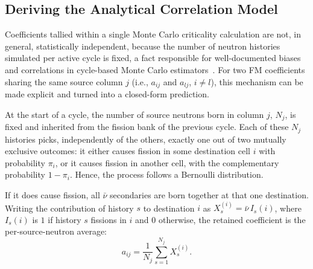 \documentclass{style/nseJournal}
\begin{document}

\subsection{Deriving the Analytical Correlation Model}
\label{sec:analytical_derivation}

Coefficients tallied within a single Monte Carlo criticality calculation are not, in general, statistically independent, because the number of neutron histories simulated per active cycle is fixed, a fact responsible for well-documented biases and correlations in cycle-based Monte Carlo estimators~\cite{BrissendenGarlick1986}. For two FM coefficients sharing the same source column $j$ (i.e., $a_{ij}$ and $a_{lj}$, $i\neq l$), this mechanism can be made explicit and turned into a closed-form prediction.

At the start of a cycle, the number of source neutrons born in column $j$, $N_j$, is fixed and inherited from the fission bank of the previous cycle. Each of these $N_j$ histories picks, independently of the others, exactly one out of two mutually exclusive outcomes: it either causes fission in some destination cell $i$ with probability $\pi_i$, or it causes fission in another cell, with the complementary probability $1-\pi_i$. Hence, the process follows a Bernoulli distribution.



If it does cause fission, all $\bar\nu$ secondaries are born together at that one destination. Writing the contribution of history $s$ to destination $i$ as $X_s^{(i)} = \bar\nu\,I_s(i)$, where $I_s(i)$ is $1$ if history $s$ fissions in $i$ and $0$ otherwise, the retained coefficient is the per-source-neutron average:
\begin{equation}
  a_{ij} = \frac{1}{N_j}\sum_{s=1}^{N_j} X_s^{(i)} .
  \label{eqn:aij_def}
\end{equation}
\end{document}
